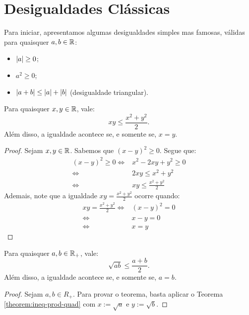 \section{Desigualdades Clássicas}

Para iniciar, apresentamos algumas desigualdades simples mas famosas, válidas para quaisquer $a,b \in \mathbb{R}$:
\begin{itemize}
  \item $\left|a\right| \ge 0$;
  \item $a^2 \ge 0$;
  \item $\left|a+b\right| \le \left|a\right| + \left|b\right|$ (desigualdade triangular).
\end{itemize}

\begin{theorem}
\label{theorem:ineq-prod-quad}
Para quaisquer $x, y \in \mathbb{R}$, vale:
%
\begin{equation*}
    xy \le \frac {x^2 +y^2} 2.
\end{equation*}
%
Além disso, a igualdade acontece se, e somente se, $x=y$.
\end{theorem}

\begin{proof}
Sejam $x, y \in \mathbb{R}$. Sabemos que $(x-y)^2 \ge 0$. Segue que:
%
\begin{align*}
	(x-y)^2 \ge 0 \iff & x^2 - 2xy + y^2 \ge 0 \\
				  \iff & 2xy \le x^2 + y^2 \\
				  \iff & xy \le \frac {x^2 + y^2} 2
\end{align*}
%
Ademais, note que a igualdade $xy = \frac {x^2 + y^2} 2$ ocorre quando:
%
\begin{align*}
	xy = \frac {x^2 + y^2} 2 \iff & (x-y)^2 = 0 \\
							 \iff & x-y = 0 \\
							 \iff & x = y
\end{align*}
\end{proof}

\begin{theorem}
Para quaisquer $a, b \in \mathbb{R}_+$, vale:
%
\begin{equation*}
    \sqrt{ab} \leq \frac {a +b} 2.
\end{equation*}
Além disso, a igualdade acontece se, e somente se, $a=b$.
\end{theorem}

\begin{proof}
Sejam $a, b \in R_+$. Para provar o teorema, basta aplicar o Teorema \ref{theorem:ineq-prod-quad} com $x := \sqrt a$ e $y := \sqrt b$.
\end{proof}


